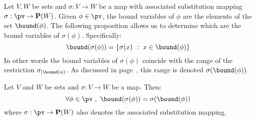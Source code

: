 Let $V,W$ be sets and $\sigma:V\to W$ be a map with associated
substitution mapping $\sigma:\pv\to{\bf P}(W)$. Given $\phi\in\pv$,
the bound variables of $\phi$ are the elements of the set
$\bound(\phi)$. The following proposition allows us to determine
which are the bound variables of $\sigma(\phi)$. Specifically:
    \[
    \bound(\sigma(\phi))=\{\sigma(x)\ :\ x\in\bound(\phi)\}
    \]
In other words the bound variables of $\sigma(\phi)$ coincide with
the range of the restriction $\sigma_{|\bound(\phi)}$. As discussed
in page~\pageref{logic:lemma:pullback}, this range is denoted
$\sigma(\bound(\phi))$.
\begin{prop}\label{logic:prop:boundvar:of:substitution}
    Let $V$ and $W$ be sets and $\sigma:V\to W$ be a map. Then:
    \[
        \forall\phi\in\pv\ ,\ \bound(\sigma(\phi))=\sigma(\bound(\phi))
    \]
    where $\sigma:\pv\to{\bf P}(W)$ also denotes the associated substitution 
    mapping.
\end{prop}
